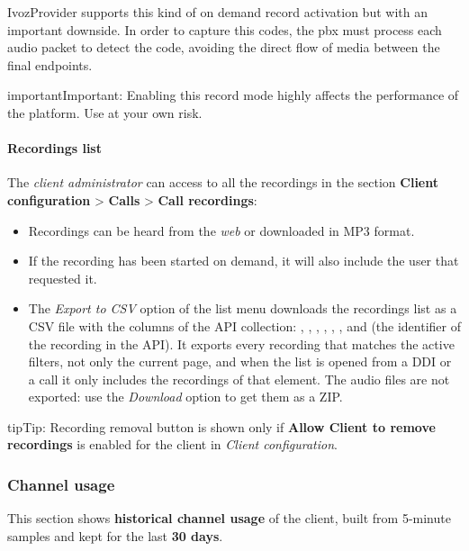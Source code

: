 \documentclass[letterpaper,10pt,english]{sphinxmanual}
\begin{document}
IvozProvider supports this kind of on demand record activation but with an
important downside. In order to capture this codes, the pbx must process each
audio packet to detect the code, avoiding the direct flow of media between the
final endpoints.

\begin{notice}{important}{Important:}
Enabling this record mode highly affects the performance of the
platform. Use at your own risk.
\end{notice}


\paragraph{Recordings list}
\label{administration_portal/client/residential/calls/call_recordings:recordings-list}
The \emph{client administrator} can access to all the recordings in the section
\textbf{Client configuration} \textgreater{} \textbf{Calls} \textgreater{} \textbf{Call recordings}:
\begin{itemize}
\item {} 
Recordings can be heard from the \emph{web} or downloaded in MP3 format.

\item {} 
If the recording has been started on demand, it will also include the user
that requested it.

\item {} 
The \emph{Export to CSV} option of the list menu downloads the recordings list as a CSV file with the
columns of the API collection: , , , , ,
,  and  (the identifier of the recording in the API).
It exports every recording that matches the active filters, not only the current page, and
when the list is opened from a DDI or a call it only includes the recordings of that element.
The audio files are not exported: use the \emph{Download} option to get them as a ZIP.

\end{itemize}

\begin{notice}{tip}{Tip:}
Recording removal button is shown only if \textbf{Allow Client to remove recordings} is enabled
for the client in \emph{Client configuration}.
\end{notice}


\subsubsection{Channel usage}
\label{administration_portal/client/residential/calls/channel_usage:channel-usage}\label{administration_portal/client/residential/calls/channel_usage::doc}
This section shows \textbf{historical channel usage} of the client, built from 5-minute samples and kept for the last
\textbf{30 days}.
\end{document}
